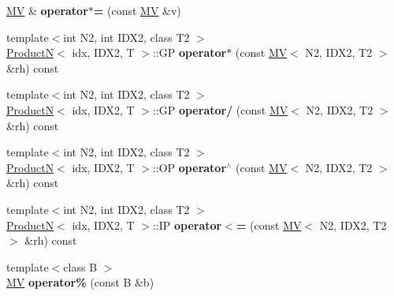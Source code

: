 \begin{DoxyCompactItemize}
\item 
\hypertarget{classvsr_1_1_m_v_ac65626120f582da929155ecfcfc35376}{\hyperlink{classvsr_1_1_m_v}{M\-V} \& {\bfseries operator$\ast$=} (const \hyperlink{classvsr_1_1_m_v}{M\-V} \&v)}\label{classvsr_1_1_m_v_ac65626120f582da929155ecfcfc35376}

\item 
\hypertarget{classvsr_1_1_m_v_a5596e1d034a72cd017f063aa36058d4f}{{\footnotesize template$<$int N2, int I\-D\-X2, class T2 $>$ }\\\hyperlink{structvsr_1_1_product_n}{Product\-N}$<$ idx, I\-D\-X2, T $>$\-::G\-P {\bfseries operator$\ast$} (const \hyperlink{classvsr_1_1_m_v}{M\-V}$<$ N2, I\-D\-X2, T2 $>$ \&rh) const }\label{classvsr_1_1_m_v_a5596e1d034a72cd017f063aa36058d4f}

\item 
\hypertarget{classvsr_1_1_m_v_ad66497f32a5dbe9652385b4b17a002e1}{{\footnotesize template$<$int N2, int I\-D\-X2, class T2 $>$ }\\\hyperlink{structvsr_1_1_product_n}{Product\-N}$<$ idx, I\-D\-X2, T $>$\-::G\-P {\bfseries operator/} (const \hyperlink{classvsr_1_1_m_v}{M\-V}$<$ N2, I\-D\-X2, T2 $>$ \&rh) const }\label{classvsr_1_1_m_v_ad66497f32a5dbe9652385b4b17a002e1}

\item 
\hypertarget{classvsr_1_1_m_v_acd0a7961fb11178881e06223f763ec32}{{\footnotesize template$<$int N2, int I\-D\-X2, class T2 $>$ }\\\hyperlink{structvsr_1_1_product_n}{Product\-N}$<$ idx, I\-D\-X2, T $>$\-::O\-P {\bfseries operator$^\wedge$} (const \hyperlink{classvsr_1_1_m_v}{M\-V}$<$ N2, I\-D\-X2, T2 $>$ \&rh) const }\label{classvsr_1_1_m_v_acd0a7961fb11178881e06223f763ec32}

\item 
\hypertarget{classvsr_1_1_m_v_a5f363fe11e44da21698e6633ab23489e}{{\footnotesize template$<$int N2, int I\-D\-X2, class T2 $>$ }\\\hyperlink{structvsr_1_1_product_n}{Product\-N}$<$ idx, I\-D\-X2, T $>$\-::I\-P {\bfseries operator$<$=} (const \hyperlink{classvsr_1_1_m_v}{M\-V}$<$ N2, I\-D\-X2, T2 $>$ \&rh) const }\label{classvsr_1_1_m_v_a5f363fe11e44da21698e6633ab23489e}

\item 
\hypertarget{classvsr_1_1_m_v_a4e07c8a8b6dc17e0df9b41cbf1a273c1}{{\footnotesize template$<$class B $>$ }\\\hyperlink{classvsr_1_1_m_v}{M\-V} {\bfseries operator\%} (const B \&b)}\label{classvsr_1_1_m_v_a4e07c8a8b6dc17e0df9b41cbf1a273c1}


\end{DoxyCompactItemize}
